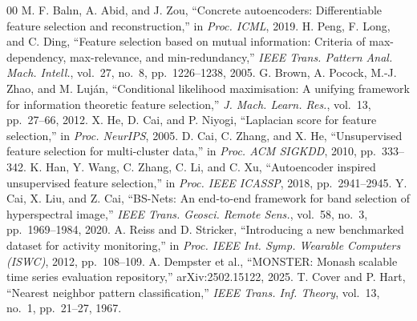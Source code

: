 \documentclass[conference]{IEEEtran}
\begin{document}
\begin{thebibliography}{00}
 M. F. Bal\i{}n, A. Abid, and J. Zou, ``Concrete
autoencoders: Differentiable feature selection and reconstruction,'' in
\emph{Proc. ICML}, 2019.
 H. Peng, F. Long, and C. Ding, ``Feature selection based on
mutual information: Criteria of max-dependency, max-relevance, and
min-redundancy,'' \emph{IEEE Trans. Pattern Anal. Mach. Intell.}, vol.~27,
no.~8, pp.~1226--1238, 2005.
 G. Brown, A. Pocock, M.-J. Zhao, and M. Luj\'an, ``Conditional
likelihood maximisation: A unifying framework for information theoretic feature
selection,'' \emph{J. Mach. Learn. Res.}, vol.~13, pp.~27--66, 2012.
 X. He, D. Cai, and P. Niyogi, ``Laplacian score for
feature selection,'' in \emph{Proc. NeurIPS}, 2005.
 D. Cai, C. Zhang, and X. He, ``Unsupervised feature selection
for multi-cluster data,'' in \emph{Proc. ACM SIGKDD}, 2010, pp.~333--342.
 K. Han, Y. Wang, C. Zhang, C. Li, and C. Xu, ``Autoencoder
inspired unsupervised feature selection,'' in \emph{Proc. IEEE ICASSP}, 2018,
pp.~2941--2945.
 Y. Cai, X. Liu, and Z. Cai, ``BS-Nets: An end-to-end
framework for band selection of hyperspectral image,'' \emph{IEEE Trans. Geosci.
Remote Sens.}, vol.~58, no.~3, pp.~1969--1984, 2020.
 A. Reiss and D. Stricker, ``Introducing a new benchmarked
dataset for activity monitoring,'' in \emph{Proc. IEEE Int. Symp. Wearable
Computers (ISWC)}, 2012, pp.~108--109.
 A. Dempster et al., ``MONSTER: Monash scalable time series
evaluation repository,'' arXiv:2502.15122, 2025.
 T. Cover and P. Hart, ``Nearest neighbor pattern
classification,'' \emph{IEEE Trans. Inf. Theory}, vol.~13, no.~1, pp.~21--27,
1967.
\end{thebibliography}
\end{document}
